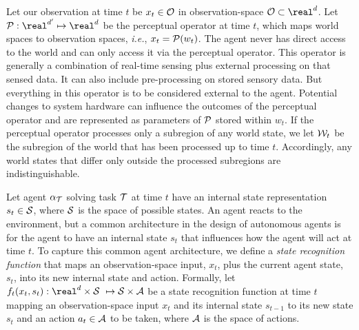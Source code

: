 Let our observation at time $t$ be $x_t\in {\cal O}$ in observation-space ${\cal O} \subset \real^d $. 
Let ${\cal P}:\real^{d'} \mapsto \real^d$ be the perceptual operator at time $t$, which maps world spaces to observation spaces, \textit{i.e.}, ${x_t = {\cal P}}(w_t)$.  The agent never has direct access to the world and can only access it via the perceptual operator. 
This operator is generally a combination of real-time sensing plus external processing on that sensed data. It can also include pre-processing on stored sensory data. But everything in this operator is to be considered external to the agent. Potential changes to system hardware can influence the outcomes of the perceptual operator and are represented as parameters of $\cal P$ stored within $w_t$. If the perceptual operator processes only a subregion of any world state, we let ${\cal W}_t$ be the subregion of the world that has been processed up to time $t$. Accordingly, any world states that differ only outside the processed subregions are indistinguishable.

 

Let agent $\alpha_{{\cal T}}$ solving task ${\cal T}$ at time $t$ have an internal state representation $s_t \in {\cal S}$, where ${\cal S}$ is the space of possible states.
An agent reacts to the environment, but a common architecture in the design of autonomous agents is for the agent to have an internal state $s_t$ that influences how the agent will act at time $t$. 
To capture this common agent architecture, we define a \emph{state recognition function} that maps an observation-space input, $x_t$, plus the current agent state, $s_t$, into its new internal state and action. 
Formally, let $f_t(x_t, s_t):\real^d\times{\cal S}\ \mapsto {\cal S}\times {\cal A}$ be a state recognition function at time $t$ mapping an observation-space input $x_t$ and its internal state $s_{t-1}$ to its new state $s_t$ and an action $a_t \in {\cal A}$ to be taken, where $\cal A$ is the space of actions. 


